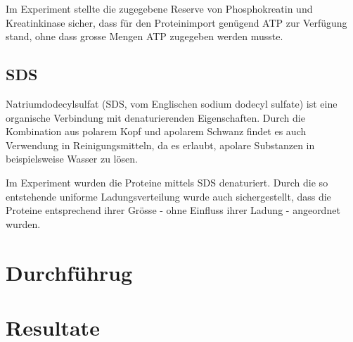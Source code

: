 \documentclass[a4paper,german]{scrreprt}
\begin{document}
Im Experiment stellte die zugegebene Reserve von Phosphokreatin und
Kreatinkinase sicher, dass für den Proteinimport genügend ATP zur Verfügung
stand, ohne dass grosse Mengen ATP zugegeben werden musste.

\section{SDS}

Natriumdodecylsulfat (SDS, vom Englischen sodium dodecyl sulfate) ist eine
organische Verbindung mit denaturierenden Eigenschaften. Durch die Kombination
aus polarem Kopf und apolarem Schwanz findet es auch Verwendung in
Reinigungsmitteln, da es erlaubt, apolare Substanzen in beispielsweise Wasser
zu lösen.

Im Experiment wurden die Proteine mittels SDS denaturiert. Durch die so
entstehende uniforme Ladungsverteilung wurde auch sichergestellt, dass die
Proteine entsprechend ihrer Grösse - ohne Einfluss ihrer Ladung - angeordnet
wurden.

\chapter{Durchführug}

\chapter{Resultate}



\end{document}
